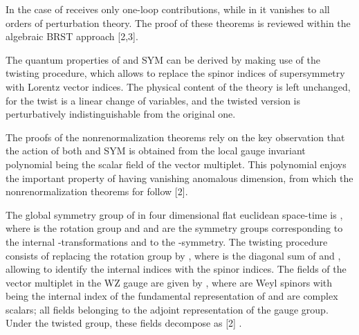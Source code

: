 \documentclass[a4paper,a4paper]{article}
\begin{document}
In the case of \coordHE{}  \coordHE{} receives only one-loop contributions, while
in \coordHE{} it vanishes to all orders of perturbation theory. The proof of these 
theorems is reviewed within the algebraic BRST approach [2,3]. 

The quantum properties of \coordHE{} and \coordHE{} SYM can be derived by making use 
of the twisting procedure, which allows to replace the spinor
indices of supersymmetry \myHighlight{$(\alpha ,\dot{\alpha})$}\coordHE{} with Lorentz vector
indices. The physical content of the theory is left
unchanged, for the twist is a linear change of variables, and the twisted
version is perturbatively indistinguishable from the original one. 

The proofs of the nonrenormalization theorems rely on the key
observation that the action of both \coordHE{} and \coordHE{} SYM is obtained from the
local gauge invariant polynomial \coordHE{}  \myHighlight{$\phi $}\coordHE{} being the scalar
field of the vector \coordHE{} multiplet. This polynomial enjoys the important
property of having vanishing anomalous dimension, from which the 
nonrenormalization theorems for \coordHE{} follow [2].

The global symmetry group of \coordHE{}
in four dimensional flat euclidean space-time is \coordHE{}, where \coordHE{}
is the rotation group and \coordHE{} and \coordHE{} are the symmetry
groups corresponding to the internal \coordHE{}-transformations and to
the \coordHE{}-symmetry. The twisting procedure consists of replacing the
rotation group by \coordHE{}, where \coordHE{} 
is the diagonal sum of \coordHE{} and \coordHE{}, allowing to identify the
internal indices with the spinor indices. The fields of the \coordHE{} vector
multiplet in the WZ gauge are given by \coordHE{}, where \coordHE{} are Weyl spinors with \coordHE{} being the
internal index of the fundamental representation of \coordHE{} and \myHighlight{$\phi ,%
\overline{\phi }$}\coordHE{} are complex scalars; all fields belonging to the adjoint
representation of the gauge group. Under the twisted group, these fields
decompose as [2] \coordHE{}.
\end{document}
